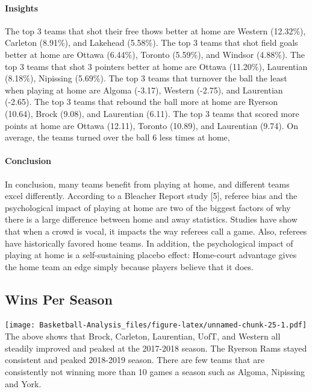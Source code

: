 \documentclass[]{book}
\let\oldparagraph\paragraph
\renewcommand{\paragraph}[1]{\oldparagraph{#1}\mbox{}}
\begin{document}
\hypertarget{insights}{%
\paragraph{Insights}\label{insights}}

The top 3 teams that shot their free thows better at home are Western (12.32\%), Carleton (8.91\%), and Lakehead (5.58\%). The top 3 teams that shot field goals better at home are Ottawa (6.44\%), Toronto (5.59\%), and Windsor (4.88\%). The top 3 teams that shot 3 pointers better at home are Ottawa (11.20\%), Laurentian (8.18\%), Nipissing (5.69\%). The top 3 teams that turnover the ball the least when playing at home are Algoma (-3.17), Western (-2.75), and Laurentian (-2.65). The top 3 teams that rebound the ball more at home are Ryerson (10.64), Brock (9.08), and Laurentian (6.11). The top 3 teams that scored more points at home are Ottawa (12.11), Toronto (10.89), and Laurentian (9.74).
On average, the teams turned over the ball 6 less times at home,

\hypertarget{conclusion}{%
\paragraph{Conclusion}\label{conclusion}}

In conclusion, many teams benefit from playing at home, and different teams excel differently. According to a Bleacher Report study {[}5{]}, referee bias and the psychological impact of playing at home are two of the biggest factors of why there is a large difference between home and away statistics. Studies have show that when a crowd is vocal, it impacts the way referees call a game. Also, referees have historically favored home teams. In addition, the psychological impact of playing at home is a self-sustaining placebo effect: Home-court advantage gives the home team an edge simply because players believe that it does.

\hypertarget{wins-per-season}{%
\subsection{Wins Per Season}\label{wins-per-season}}

\texttt{[image: Basketball-Analysis\_files/figure-latex/unnamed-chunk-25-1.pdf]}
The above shows that Brock, Carleton, Laurentian, UofT, and Western all steadily improved and peaked at the 2017-2018 season. The Ryerson Rams stayed consistent and peaked 2018-2019 season. There are few teams that are consistently not winning more than 10 games a season such as Algoma, Nipissing and York.
\end{document}
